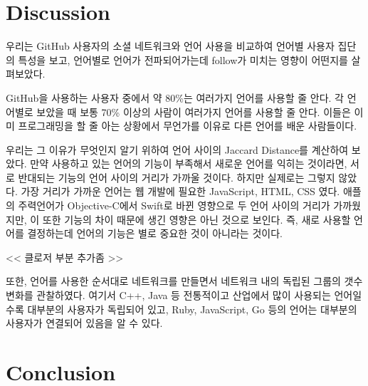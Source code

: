 \documentclass[10pt, a4paper, titlepage]{article}
\begin{document}
\section{Discussion}
우리는 GitHub 사용자의 소셜 네트워크와 언어 사용을 비교하여 언어별 사용자 집단의 특성을 보고, 언어별로 언어가 전파되어가는데 follow가 미치는 영향이 어떤지를 살펴보았다.

GitHub을 사용하는 사용자 중에서 약 80\%는 여러가지 언어를 사용할 줄 안다. 각 언어별로 보았을 때 보통 70\% 이상의 사람이 여러가지 언어를 사용할 줄 안다. 이들은 이미 프로그래밍을 할 줄 아는 상황에서 무언가를 이유로 다른 언어를 배운 사람들이다.

우리는 그 이유가 무엇인지 알기 위하여 언어 사이의 Jaccard Distance를 계산하여 보았다. 만약 사용하고 있는 언어의 기능이 부족해서 새로운 언어를 익히는 것이라면, 서로 반대되는 기능의 언어 사이의 거리가 가까울 것이다. 하지만 실제로는 그렇지 않았다. 가장 거리가 가까운 언어는 웹 개발에 필요한 JavaScript, HTML, CSS 였다. 애플의 주력언어가 Objective-C에서 Swift로 바뀐 영향으로 두 언어 사이의 거리가 가까웠지만, 이 또한 기능의 차이 때문에 생긴 영향은 아닌 것으로 보인다. 즉, 새로 사용할 언어를 결정하는데 언어의 기능은 별로 중요한 것이 아니라는 것이다.

<< 클로저 부분 추가좀 >>

또한, 언어를 사용한 순서대로 네트워크를 만들면서 네트워크 내의 독립된 그룹의 갯수 변화를 관찰하였다. 여기서 C++, Java 등 전통적이고 산업에서 많이 사용되는 언어일수록 대부분의 사용자가 독립되어 있고, Ruby, JavaScript, Go 등의 언어는 대부분의 사용자가 연결되어 있음을 알 수 있다.

\section{Conclusion}
\end{document}
